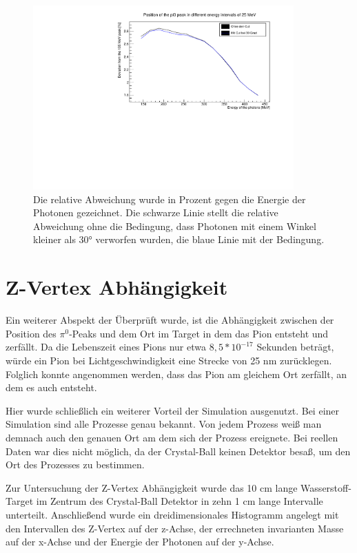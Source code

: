 \documentclass[a4paper,11pt,oneside,final,german,openbib,pdftex]{scrbook}
\begin{document}
\begin{figure}[h!]
	\begin{center}
		\includegraphics[width=100mm]{EnergyAngleBothRelativeDeviation}
		\caption{Die relative Abweichung wurde in Prozent gegen die Energie der Photonen gezeichnet. Die schwarze Linie stellt die relative Abweichung ohne die Bedingung, dass Photonen mit einem Winkel kleiner als 30° verworfen wurden, die blaue Linie mit der Bedingung.}
	\end{center}
\end{figure}


\section{Z-Vertex Abh\"angigkeit}
\label{sec:Z-Vertex-Abaengigkeit}
Ein weiterer Abspekt der \"Uberpr\"uft wurde, ist die Abh\"angigkeit zwischen der Position des $\pi^0$-Peaks und dem Ort im Target in dem das Pion entsteht und zerf\"allt. Da die Lebenszeit eines Pions nur etwa $8,5*10^{-17}$ Sekunden betr\"agt, w\"urde ein Pion bei Lichtgeschwindigkeit eine Strecke von 25 nm zur\"ucklegen. Folglich konnte angenommen werden, dass das Pion am gleichem Ort zerf\"allt, an dem es auch entsteht.

 Hier wurde schlie{\ss}lich ein weiterer Vorteil der Simulation ausgenutzt. Bei einer Simulation sind alle Prozesse genau bekannt. Von jedem Prozess wei{\ss} man demnach auch den genauen Ort am dem sich der Prozess ereignete. Bei reellen Daten war dies nicht m\"oglich, da der Crystal-Ball keinen Detektor besa{\ss}, um den Ort des Prozesses zu bestimmen. 
 
Zur Untersuchung der Z-Vertex Abhängigkeit wurde das 10 cm lange Wasserstoff-Target im Zentrum des Crystal-Ball Detektor in zehn 1 cm lange Intervalle unterteilt. Anschließend wurde ein dreidimensionales Histogramm angelegt mit den Intervallen des Z-Vertex auf der z-Achse, der errechneten invarianten Masse auf der x-Achse und der Energie der Photonen auf der y-Achse.
\end{document}
